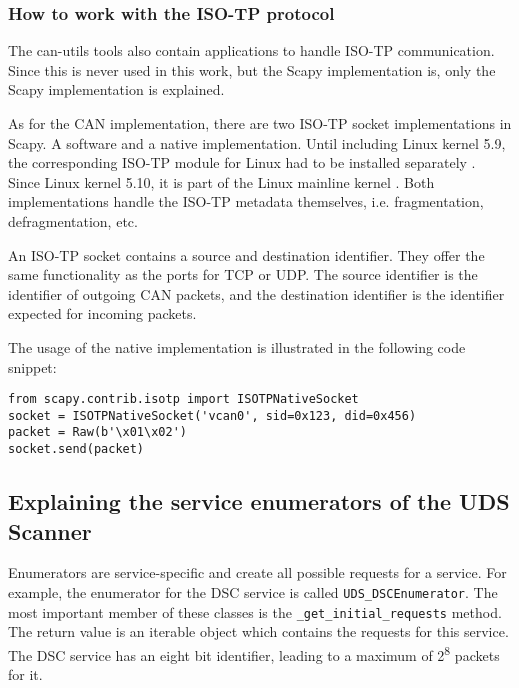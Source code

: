 \subsubsection{How to work with the ISO-TP protocol}

The can-utils tools also contain applications to handle ISO-TP communication. Since this is never used in this work, but the Scapy implementation is, only the Scapy implementation is explained.

As for the CAN implementation, there are two ISO-TP socket implementations in Scapy. A software and a native implementation. Until including Linux kernel 5.9, the corresponding ISO-TP module for Linux had to be installed separately \cite{isotp-module}. Since Linux kernel 5.10, it is part of the Linux mainline kernel \cite{isotp-commit}. Both implementations handle the ISO-TP metadata themselves, i.e.  fragmentation, defragmentation, etc.

An ISO-TP socket contains a source and destination identifier. They offer the same functionality as the ports for TCP or UDP. The source identifier is the identifier of outgoing CAN packets, and the destination identifier is the identifier expected for incoming packets.

The usage of the native implementation is illustrated in the following code snippet:

\begin{samepage}
\begin{verbatim}
from scapy.contrib.isotp import ISOTPNativeSocket
socket = ISOTPNativeSocket('vcan0', sid=0x123, did=0x456)
packet = Raw(b'\x01\x02')
socket.send(packet)
\end{verbatim}
\end{samepage}

\subsection{Explaining the service enumerators of the UDS Scanner}


Enumerators are service-specific and create all possible requests for a service.
For example, the enumerator for the DSC service is called \texttt{UDS_DSCEnumerator}. The most important member of these classes is the \texttt{_get_initial_requests} method. The return value is an iterable object which contains the requests for this service. The DSC service has an eight bit identifier, leading to a maximum of 2\textsuperscript{8} packets for it.


